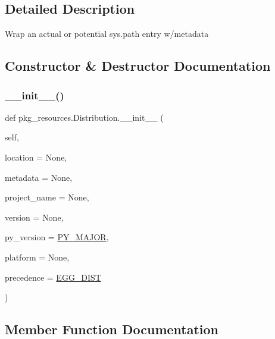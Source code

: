 \subsection{Detailed Description}
\begin{DoxyVerb}Wrap an actual or potential sys.path entry w/metadata\end{DoxyVerb}
 

\subsection{Constructor \& Destructor Documentation}
\mbox{\label{classpkg__resources_1_1Distribution_af4cf119ffe7fc00fceb8409576da4515}} 
\subsubsection{\texorpdfstring{\+\_\+\+\_\+init\+\_\+\+\_\+()}{\_\_init\_\_()}}
{\footnotesize\ttfamily def pkg\+\_\+resources.\+Distribution.\+\_\+\+\_\+init\+\_\+\+\_\+ (\begin{DoxyParamCaption}\item[{}]{self,  }\item[{}]{location = {\ttfamily None},  }\item[{}]{metadata = {\ttfamily None},  }\item[{}]{project\+\_\+name = {\ttfamily None},  }\item[{}]{version = {\ttfamily None},  }\item[{}]{py\+\_\+version = {\ttfamily \hyperlink{namespacepkg__resources_a27901fd744697f2b2d55b6f1255cf020}{P\+Y\+\_\+\+M\+A\+J\+OR}},  }\item[{}]{platform = {\ttfamily None},  }\item[{}]{precedence = {\ttfamily \hyperlink{namespacepkg__resources_a5a0f6c722896ed99cec71096149b840f}{E\+G\+G\+\_\+\+D\+I\+ST}} }\end{DoxyParamCaption})}



\subsection{Member Function Documentation}
\mbox{\label{classpkg__resources_1_1Distribution_a67087b4e3b38b54036245173353e44c4}} 
